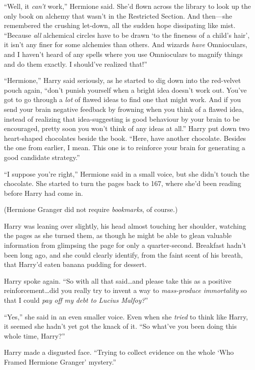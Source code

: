 “Well, it \emph{can’t} work,” Hermione said. She’d flown across the library to look up the only book on alchemy that wasn’t in the Restricted Section. And then—she remembered the crushing let-down, all the sudden hope dissipating like mist. “Because \emph{all} alchemical circles have to be drawn ‘to the fineness of a child’s hair’, it isn’t any finer for some alchemies than others. And wizards \emph{have} Omnioculars, and I haven’t heard of any spells where you use Omnioculars to magnify things and do them exactly. I should’ve realized that!”

“Hermione,” Harry said seriously, as he started to dig down into the red-velvet pouch again, “don’t punish yourself when a bright idea doesn’t work out. You’ve got to go through a \emph{lot} of flawed ideas to find one that might work. And if you send your brain negative feedback by frowning when you think of a flawed idea, instead of realizing that idea-suggesting is good behaviour by your brain to be encouraged, pretty soon you won’t think of any ideas at all.” Harry put down two heart-shaped chocolates beside the book. “Here, have another chocolate. Besides the one from earlier, I mean. This one is to reinforce your brain for generating a good candidate strategy.”

“I suppose you’re right,” Hermione said in a small voice, but she didn’t touch the chocolate. She started to turn the pages back to 167, where she’d been reading before Harry had come in.

(Hermione Granger did not require \emph{bookmarks}, of course.)

Harry was leaning over slightly, his head almost touching her shoulder, watching the pages as she turned them, as though he might be able to glean valuable information from glimpsing the page for only a quarter-second. Breakfast hadn’t been long ago, and she could clearly identify, from the faint scent of his breath, that Harry’d eaten banana pudding for dessert.

Harry spoke again. “So with all that said…and please take this as a positive reinforcement…did you really try to invent a way to \emph{mass-produce immortality} so that I could \emph{pay off my debt to Lucius Malfoy?}”

“Yes,” she said in an even smaller voice. Even when she \emph{tried} to think like Harry, it seemed she hadn’t yet got the knack of it. “So what’ve you been doing this whole time, Harry?”

Harry made a disgusted face. “Trying to collect evidence on the whole ‘Who Framed Hermione Granger’ mystery.”

